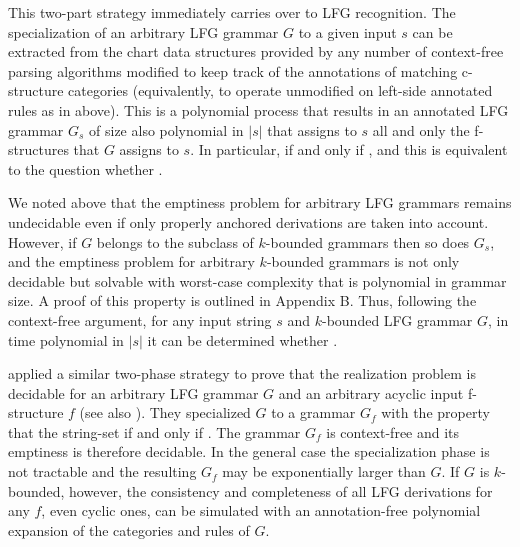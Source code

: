 \documentclass[output=paper,hidelinks]{langscibook}
\begin{document}
This two-part strategy immediately carries over to LFG recognition.  The specialization of an arbitrary LFG grammar $G$ to a given input $s$ can be extracted from the chart data structures provided by any number of context-free parsing algorithms modified to keep track of the annotations of matching c-structure categories (equivalently, to operate unmodified on left-side annotated rules as in  above).  This is a polynomial process that results in an annotated LFG grammar $G_s$ of size also polynomial in $|s|$ that assigns to $s$ all and only the f-structures that $G$ assigns to $s$.  In particular,  if and only if , and this is equivalent to the question whether .


We noted above that the emptiness problem for arbitrary LFG grammars remains undecidable even if only properly anchored derivations are taken into account. However, if $G$ belongs to the subclass of $k$-bounded grammars then so does $G_s$, and the emptiness problem for arbitrary $k$-bounded grammars is not only decidable but solvable with worst-case complexity that is polynomial in grammar size. A proof of this property is outlined in Appendix B. Thus, following the context-free argument, for any input string $s$ and $k$-bounded LFG grammar $G$, in time polynomial in $|s|$ it can be determined whether .

\cite{WedekindKaplan:Gen} applied a similar two-phase strategy to prove that the realization problem is decidable for an arbitrary LFG grammar $G$ and an arbitrary acyclic input f-structure $f$ (see also \citet{kaplan-wedekind-2000-coling}). They specialized $G$ to a grammar $G_f$ with the property that the string-set  if and only if . The grammar $G_f$ is context-free and its emptiness is therefore decidable. In the general case the specialization phase is not tractable and the resulting $G_f$ may be exponentially larger than $G$.   If $G$ is $k$-bounded, however, the consistency and completeness of all LFG derivations for any $f$, even cyclic ones, can be simulated with an annotation-free polynomial expansion of the categories and rules of $G$.  
\end{document}
